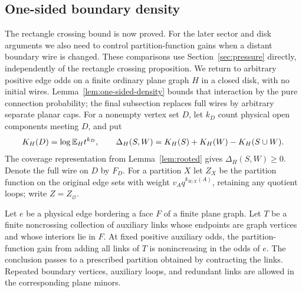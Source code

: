 \subsection{One-sided boundary density}

The rectangle crossing bound is now proved. For the later sector and
disk arguments we also need to control partition-function gains when
a distant boundary wire is changed. These comparisons use
Section~\ref{sec:pressure} directly, independently of the rectangle
crossing proposition. We return to arbitrary positive
edge odds on a finite ordinary plane graph $H$ in a closed disk, with
no initial wires. Lemma~\ref{lem:one-sided-density} bounds that interaction
by the pure connection probability; the final subsection replaces full
wires by arbitrary separate planar caps.
For a nonempty vertex set $D$, let $k_D$ count physical open components
meeting $D$, and put
\[
 K_H(D)=\log\mathbb E_H t^{k_D},\qquad
 \Delta_H(S,W)=K_H(S)+K_H(W)-K_H(S\cup W).
\]
The coverage representation from Lemma~\ref{lem:rooted} gives
$\Delta_H(S,W)\ge0$.  Denote the full wire on $D$ by $F_D$.
For a partition $X$ let $Z_X$ be the partition function on the original
edge sets with weight $v_Aq^{k_{H/X}(A)}$, retaining any quotient loops;
write $Z=Z_\varnothing$.

\begin{lemma}
\label{rect:face-gain}
Let $e$ be a physical edge bordering a face $F$ of a finite plane
graph.  Let $T$ be a finite noncrossing collection of auxiliary links
whose endpoints are graph vertices and whose interiors lie in $F$.
At fixed positive auxiliary odds, the partition-function gain from
adding all links of $T$ is nonincreasing in the odds of $e$.
The conclusion passes to a prescribed partition obtained by contracting
the links.  Repeated boundary vertices, auxiliary loops, and redundant
links are allowed in the corresponding plane minors.
\end{lemma}

